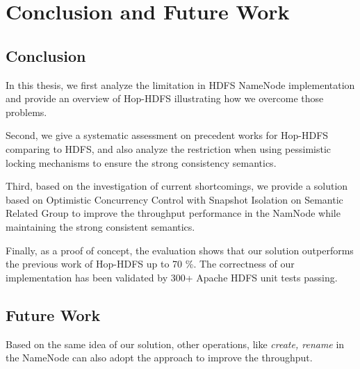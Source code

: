 
%
%


\chapter{Conclusion and Future Work}
\label{ch:conclusion}

%




\section{Conclusion}

In this thesis, we first analyze the limitation in HDFS NameNode implementation and provide an overview of Hop-HDFS illustrating how we overcome those problems. 

\noindent Second, we give a systematic assessment on precedent works for Hop-HDFS comparing to HDFS, and also analyze the restriction when using pessimistic locking mechanisms to ensure the strong consistency semantics.

\noindent Third, based on the investigation of current shortcomings, we provide a solution based on Optimistic Concurrency Control with Snapshot Isolation on Semantic Related Group to improve the throughput performance in the NamNode while maintaining the strong consistent semantics.

\noindent Finally, as a proof of concept, the evaluation shows that our solution outperforms the previous work of Hop-HDFS up to 70 \%. The correctness of our implementation has been validated by 300+ Apache HDFS unit tests passing.


\section{Future Work}

Based on the same idea of our solution, other operations, like \textit{create, rename} in the NameNode can also adopt the approach to improve the throughput.

